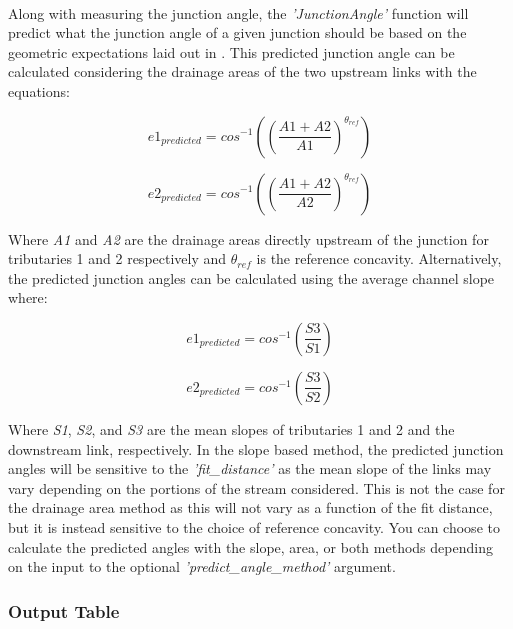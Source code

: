 \paragraph{}Along with measuring the junction angle, the \textit{'JunctionAngle'} function will predict what the junction angle of a given junction should be based on the geometric expectations laid out in \cite{Howard1971}. This predicted junction angle can be calculated considering the drainage areas of the two upstream links with the equations:

\begin{equation}
e1_{predicted}=cos^{-1} \left( \left( \frac{A1+A2}{A1} \right) ^{\theta_{ref}} \right)
\end{equation}

\begin{equation}
e2_{predicted}=cos^{-1} \left( \left( \frac{A1+A2}{A2} \right) ^{\theta_{ref}} \right)
\end{equation}

\noindent Where \textit{A1} and \textit{A2} are the drainage areas directly upstream of the junction for tributaries 1 and 2 respectively and $\theta_{ref}$ is the reference concavity. Alternatively, the predicted junction angles can be calculated using the average channel slope where:

\begin{equation}
e1_{predicted}=cos^{-1} \left( \frac{S3}{S1} \right)
\end{equation}

\begin{equation}
e2_{predicted}=cos^{-1} \left( \frac{S3}{S2} \right)
\end{equation}

\noindent Where \textit{S1}, \textit{S2}, and \textit{S3} are the mean slopes of tributaries 1 and 2 and the downstream link, respectively. In the slope based method, the predicted junction angles will be sensitive to the \textit{'fit\_distance'} as the mean slope of the links may vary depending on the portions of the stream considered. This is not the case for the drainage area method as this will not vary as a function of the fit distance, but it is instead sensitive to the choice of reference concavity. You can choose to calculate the predicted angles with the slope, area, or both methods depending on the input to the optional \textit{'predict\_angle\_method'} argument.

\subsubsection{Output Table}
